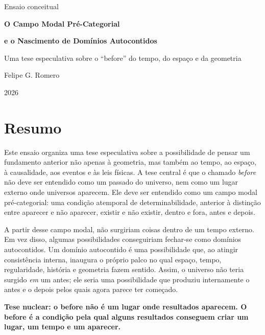 \documentclass[11pt,a4paper]{article}
\newenvironment{corebox}{\begin{framed}\small\bfseries}{\end{framed}}
\begin{document}
\begin{titlepage}
\centering
\vspace*{2.2cm}
{\Large\sffamily Ensaio conceitual}\par
\vspace{0.7cm}
{\Huge\bfseries\sffamily O Campo Modal Pré-Categorial}\par
\vspace{0.35cm}
{\LARGE\bfseries\sffamily e o Nascimento de Domínios Autocontidos}\par
\vspace{1.1cm}
{\large Uma tese especulativa sobre o ``before'' do tempo, do espaço e da geometria}\par
\vfill
{\large Felipe G. Romero}\par
\vspace{0.4cm}
{\large 2026}\par
\vspace*{1.5cm}
\end{titlepage}

\tableofcontents
\newpage

\section*{Resumo}

Este ensaio organiza uma tese especulativa sobre a possibilidade de pensar um fundamento anterior não apenas à geometria, mas também ao tempo, ao espaço, à causalidade, aos eventos e às leis físicas. A tese central é que o chamado \emph{before} não deve ser entendido como um passado do universo, nem como um lugar externo onde universos aparecem. Ele deve ser entendido como um campo modal pré-categorial: uma condição atemporal de determinabilidade, anterior à distinção entre aparecer e não aparecer, existir e não existir, dentro e fora, antes e depois.

A partir desse campo modal, não surgiriam coisas dentro de um tempo externo. Em vez disso, algumas possibilidades conseguiriam fechar-se como domínios autocontidos. Um domínio autocontido é uma possibilidade que, ao atingir consistência interna, inaugura o próprio palco no qual espaço, tempo, regularidade, história e geometria fazem sentido. Assim, o universo não teria surgido \emph{em} um antes; ele seria uma possibilidade que produziu internamente o antes e o depois pelos quais agora parece ter começado.

\begin{corebox}
Tese nuclear: o before não é um lugar onde resultados aparecem. O before é a condição pela qual alguns resultados conseguem criar um lugar, um tempo e um aparecer.
\end{corebox}
\end{document}
